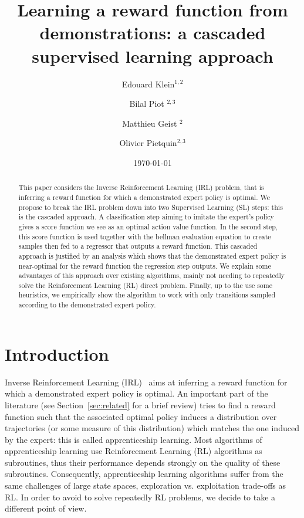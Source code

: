 \documentclass[smallextended]{svjour3}
\begin{document}
\title{Learning a reward function from demonstrations: a cascaded supervised learning approach}
\author{Edouard Klein$^{1,2}$ \and Bilal Piot $^{2,3}$\and Matthieu Geist $^{2}$\and Olivier Pietquin$^{2,3}$}
\date{\today}


\maketitle

\begin{abstract}
  This paper considers the Inverse Reinforcement Learning (IRL) problem, that is inferring a reward function for which a demonstrated expert policy is optimal.
We propose to break the IRL problem down into two Supervised Learning (SL) steps: this is the cascaded approach. A classification step aiming to imitate the expert's policy gives a score function we see as an optimal action value function. In the second step, this score function is used together with the bellman evaluation equation to create samples then fed to a regressor that outputs a reward function.
This cascaded approach is justified by an analysis which shows that the demonstrated expert policy is near-optimal for the reward function the regression step outputs. We explain some advantages of this approach over existing algorithms, mainly not needing to repeatedly solve the Reinforcement Learning (RL) direct problem.
Finally, up to the use some heuristics, we empirically show the algorithm to work with only transitions sampled according to the demonstrated expert policy.
  \end{abstract}
\section{Introduction}
\label{sec-2}

Inverse Reinforcement Learning (IRL)~\cite{russell1998learning} aims at inferring a reward function for which a demonstrated expert policy is optimal. An important part of the literature (see Section~\ref{sec:related} for a brief review) tries to find a reward function such that the associated optimal policy induces a distribution over trajectories (or some measure of this distribution) which matches the one induced by the expert: this is called apprenticeship learning. Most algorithms of apprenticeship learning use Reinforcement
Learning (RL) algorithms as subroutines, thus their performance depends strongly on the quality of these subroutines. Consequently, apprenticeship learning algorithms suffer from the
same challenges of large state spaces, exploration vs. exploitation trade-offs as RL. In order to avoid to solve repeatedly RL problems, we decide to take a different point of view.
\end{document}
